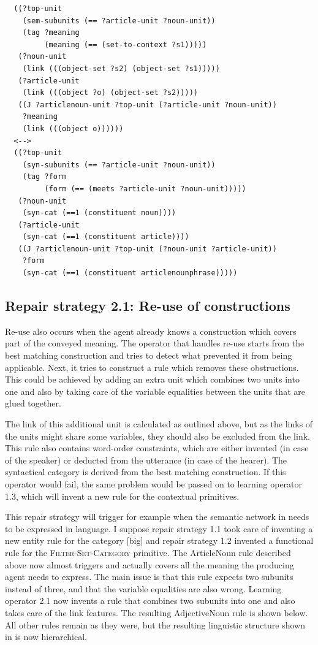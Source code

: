 \footnotesize
{}
\begin{lstlisting}
  ((?top-unit
    (sem-subunits (== ?article-unit ?noun-unit))
    (tag ?meaning 
         (meaning (== (set-to-context ?s1)))))
   (?noun-unit 
    (link (((object-set ?s2) (object-set ?s1)))))
   (?article-unit 
    (link (((object ?o) (object-set ?s2)))))
   ((J ?articlenoun-unit ?top-unit (?article-unit ?noun-unit))
    ?meaning
    (link (((object o))))))
  <-->
  ((?top-unit
    (syn-subunits (== ?article-unit ?noun-unit))
    (tag ?form 
         (form (== (meets ?article-unit ?noun-unit)))))
   (?noun-unit 
    (syn-cat (==1 (constituent noun))))
   (?article-unit 
    (syn-cat (==1 (constituent article))))
   ((J ?articlenoun-unit ?top-unit (?noun-unit ?article-unit))
    ?form
    (syn-cat (==1 (constituent articlenounphrase)))))
\end{lstlisting}
\normalsize

\subsection{Repair strategy 2.1: Re-use of constructions}

Re-use also occurs when the agent already knows a construction which
covers part of the conveyed meaning. The operator that handles
re-use starts from the best matching construction and tries to detect
what prevented it from being applicable. Next, it tries to construct a
rule which removes these obstructions. This could be achieved by
adding an extra unit which combines two units into one and also by
taking care of the variable equalities between the units that are
glued together.

The link of this additional unit is calculated as
outlined above, but as the links of the units might share some
variables, they should also be excluded from the link. This rule also
contains word-order constraints, which are either invented (in case of
the speaker) or deducted from the utterance (in case of the
hearer). The syntactical category is derived from the best matching
construction. If this operator would fail, the same problem would be passed
on to learning operator 1.3, which will invent a new rule for the
contextual primitives.

This repair strategy will trigger for example when the semantic
network in  needs to be expressed in
language. I suppose repair strategy 1.1 took care of inventing a
new entity rule for the category [big] and repair strategy 1.2
invented a functional rule for the \textsc{Filter-Set-Category}
primitive. The ArticleNoun rule described above now almost
triggers and actually covers all the meaning the producing agent needs
to express. The main issue is that this rule expects two subunits
instead of three, and that the variable equalities are also wrong. Learning
operator 2.1 now invents a rule that combines two subunits into one
and also takes care of the link features. The resulting AdjectiveNoun
rule is shown below. All other rules remain as they were, but the
resulting linguistic structure shown in 
is now hierarchical.

